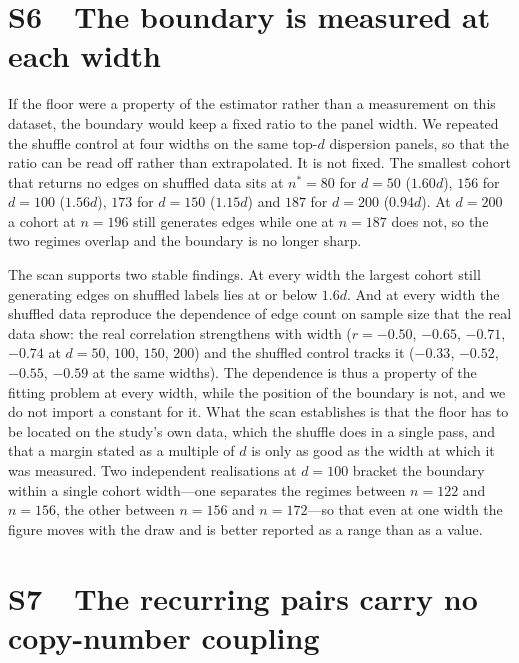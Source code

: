 \documentclass[11pt]{article}
\begin{document}
\section*{S6\ \ The boundary is measured at each width}

If the floor were a property of the estimator rather than a measurement on this dataset, the boundary would keep a fixed ratio to the panel width. We repeated the shuffle control at four widths on the same top-$d$ dispersion panels, so that the ratio can be read off rather than extrapolated. It is not fixed. The smallest cohort that returns no edges on shuffled data sits at $n^{*} = 80$ for $d = 50$ ($1.60d$), $156$ for $d = 100$ ($1.56d$), $173$ for $d = 150$ ($1.15d$) and $187$ for $d = 200$ ($0.94d$). At $d = 200$ a cohort at $n = 196$ still generates edges while one at $n = 187$ does not, so the two regimes overlap and the boundary is no longer sharp.

The scan supports two stable findings. At every width the largest cohort still generating edges on shuffled labels lies at or below $1.6d$. And at every width the shuffled data reproduce the dependence of edge count on sample size that the real data show: the real correlation strengthens with width ($r = -0.50$, $-0.65$, $-0.71$, $-0.74$ at $d = 50$, $100$, $150$, $200$) and the shuffled control tracks it ($-0.33$, $-0.52$, $-0.55$, $-0.59$ at the same widths). The dependence is thus a property of the fitting problem at every width, while the position of the boundary is not, and we do not import a constant for it. What the scan establishes is that the floor has to be located on the study's own data, which the shuffle does in a single pass, and that a margin stated as a multiple of $d$ is only as good as the width at which it was measured. Two independent realisations at $d = 100$ bracket the boundary within a single cohort width---one separates the regimes between $n = 122$ and $n = 156$, the other between $n = 156$ and $n = 172$---so that even at one width the figure moves with the draw and is better reported as a range than as a value.

\section*{S7\ \ The recurring pairs carry no copy-number coupling}
\end{document}
